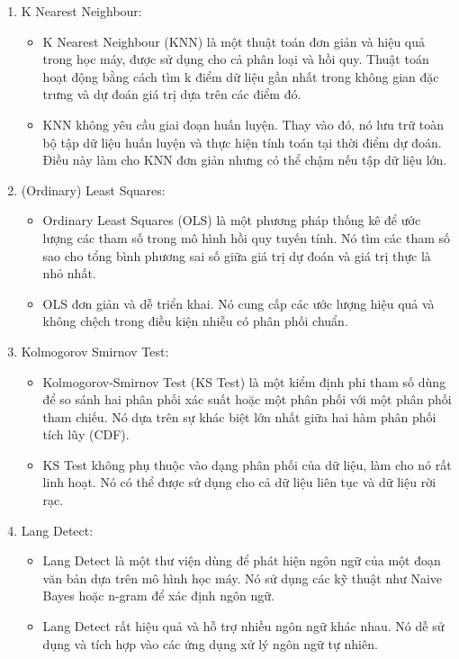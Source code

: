 \begin{enumerate}
    \item K Nearest Neighbour:
    \begin{itemize}
        \item K Nearest Neighbour (KNN) là một thuật toán đơn giản và hiệu quả trong học máy, được sử dụng cho cả phân loại và hồi quy. Thuật toán hoạt động bằng cách tìm k điểm dữ liệu gần nhất trong không gian đặc trưng và dự đoán giá trị dựa trên các điểm đó.
        \item KNN không yêu cầu giai đoạn huấn luyện. Thay vào đó, nó lưu trữ toàn bộ tập dữ liệu huấn luyện và thực hiện tính toán tại thời điểm dự đoán. Điều này làm cho KNN đơn giản nhưng có thể chậm nếu tập dữ liệu lớn.
    \end{itemize}
    \item (Ordinary) Least Squares:
    \begin{itemize}
        \item Ordinary Least Squares (OLS) là một phương pháp thống kê để ước lượng các tham số trong mô hình hồi quy tuyến tính. Nó tìm các tham số sao cho tổng bình phương sai số giữa giá trị dự đoán và giá trị thực là nhỏ nhất.
        \item OLS đơn giản và dễ triển khai. Nó cung cấp các ước lượng hiệu quả và không chệch trong điều kiện nhiễu có phân phối chuẩn.
    \end{itemize}
    \item Kolmogorov Smirnov Test:
    \begin{itemize}
        \item Kolmogorov-Smirnov Test (KS Test) là một kiểm định phi tham số dùng để so sánh hai phân phối xác suất hoặc một phân phối với một phân phối tham chiếu. Nó dựa trên sự khác biệt lớn nhất giữa hai hàm phân phối tích lũy (CDF).
        \item KS Test không phụ thuộc vào dạng phân phối của dữ liệu, làm cho nó rất linh hoạt. Nó có thể được sử dụng cho cả dữ liệu liên tục và dữ liệu rời rạc.
    \end{itemize}
    \item Lang Detect:
    \begin{itemize}
        \item Lang Detect là một thư viện dùng để phát hiện ngôn ngữ của một đoạn văn bản dựa trên mô hình học máy. Nó sử dụng các kỹ thuật như Naive Bayes hoặc n-gram để xác định ngôn ngữ.
        \item Lang Detect rất hiệu quả và hỗ trợ nhiều ngôn ngữ khác nhau. Nó dễ sử dụng và tích hợp vào các ứng dụng xử lý ngôn ngữ tự nhiên.
    \end{itemize}

\end{enumerate}
\clearpage
